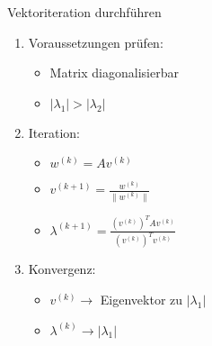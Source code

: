 \begin{KR}{Vektoriteration durchführen}
\begin{enumerate}
    \item Voraussetzungen prüfen:
    \begin{itemize}
        \item Matrix diagonalisierbar
        \item $|\lambda_1| > |\lambda_2|$
    \end{itemize}
    
    \item Iteration:
    \begin{itemize}
        \item $w^{(k)} = Av^{(k)}$
        \item $v^{(k+1)} = \frac{w^{(k)}}{\|w^{(k)}\|}$
        \item $\lambda^{(k+1)} = \frac{(v^{(k)})^TAv^{(k)}}{(v^{(k)})^Tv^{(k)}}$
    \end{itemize}
    
    \item Konvergenz:
    \begin{itemize}
        \item $v^{(k)} \to$ Eigenvektor zu $|\lambda_1|$
        \item $\lambda^{(k)} \to |\lambda_1|$
    \end{itemize}
\end{enumerate}
\end{KR}


